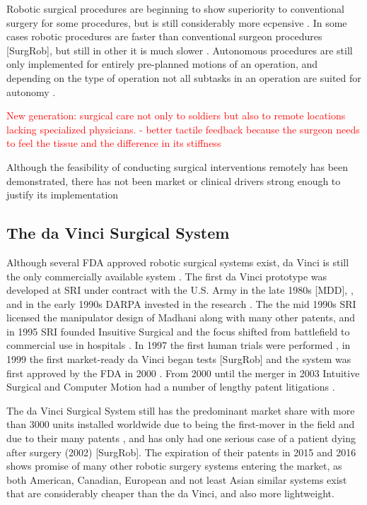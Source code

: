 Robotic surgical procedures are beginning to show superiority to conventional surgery for some procedures, but is still considerably more ecpensive \citep{bib:docatadist}. In some cases robotic procedures are faster than conventional surgeon procedures [SurgRob], but still in other it is much slower \citep{bib:raven_ii,bib:raven_debride}.
Autonomous procedures are still only implemented for entirely pre-planned motions of an operation, and depending on the type of operation not all subtasks in an operation are suited for autonomy \citep{bib:raven_debride,bib:raven_ii}.


\textcolor{red}{New generation: surgical care not only to soldiers but also to remote locations lacking specialized physicians. - better tactile feedback because the surgeon needs to feel the tissue and the difference in its stiffness}

Although the feasibility of conducting surgical interventions remotely has been demonstrated, there has not been market or clinical drivers strong enough to justify its implementation \citep[p 38]{bib:surgical_book}

\subsection{The da Vinci Surgical System}
Although several FDA approved robotic surgical systems exist, da Vinci is still the only commercially available system \citep{bib:docatadist,bib:intuitive_monopoly}. The first da Vinci prototype was developed at SRI under contract with the U.S. Army in the late 1980s [MDD], \citep{bib:brown_univ}, and in the early 1990s DARPA invested in the research \citep[p 74]{bib:surgical_book}. The the mid 1990s SRI licensed the manipulator design of Madhani along with many other patents, and in 1995 SRI founded Insuitive Surgical and the focus shifted from battlefield to commercial use in hospitals \citep{bib:intuitive_monopoly}.
In 1997 the first human trials were performed \citep{bib:intuitive_monopoly}, in 1999 the first market-ready da Vinci began tests [SurgRob] and the system was first approved by the FDA in 2000 \citep{bib:intuitive_monopoly,bib:brown_univ}. From 2000 until the merger in 2003 Intuitive Surgical and Computer Motion had a number of lengthy patent litigations \citep{bib:intuitive_monopoly,bib:telesurg_history}.

The da Vinci Surgical System still has the predominant market share with more than 3000 units installed worldwide due to being the first-mover in the field and due to their many patents \citep{bib:intuitive_monopoly}, and has only had one serious case of a patient dying after surgery (2002) [SurgRob].
The expiration of their patents in 2015 and 2016 \citep{bib:intuitive_monopoly} shows promise of many other robotic surgery systems entering the market, as both American, Canadian, European and not least Asian similar systems exist that are considerably cheaper than the da Vinci, and also more lightweight.


